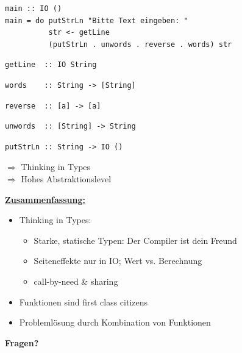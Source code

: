 \documentclass[unknownkeysallowed]{beamer}
\begin{document}
  \begin{frame}[fragile]

  \begin{verbatim}
main :: IO ()
main = do putStrLn "Bitte Text eingeben: "
          str <- getLine
          (putStrLn . unwords . reverse . words) str
  \end{verbatim}
  
\pause

\begin{verbatim}
getLine  :: IO String
\end{verbatim}
\pause
\begin{verbatim}
words    :: String -> [String]
\end{verbatim}
\pause
\begin{verbatim}
reverse  :: [a] -> [a]
\end{verbatim}
\pause
\begin{verbatim}
unwords  :: [String] -> String
\end{verbatim}
\pause
\begin{verbatim}
putStrLn :: String -> IO ()
\end{verbatim}
\bigskip 
\pause

$\Rightarrow$ Thinking in Types      \\ \pause
$\Rightarrow$ Hohes Abstraktionslevel

\end{frame}


\begin{frame}

\Large\textbf{\underline{Zusammenfassung:}}\bigskip\normalsize
\pause

\begin{itemize}
\item Thinking in Types: \pause
      \begin{itemize}
      \item Starke, statische Typen: Der Compiler ist dein Freund \pause
      \item Seiteneffekte nur in IO; Wert vs. Berechnung \pause
      \item call-by-need \& sharing\pause
      \end{itemize}
\item Funktionen sind \glqq first class citizens\grqq \pause
\item Problemlösung durch Kombination von Funktionen
\end{itemize}
  
\end{frame}



\begin{frame}

\begin{center}
\Large\textbf{Fragen?}
\end{center}

\end{frame}
  
\end{document}
